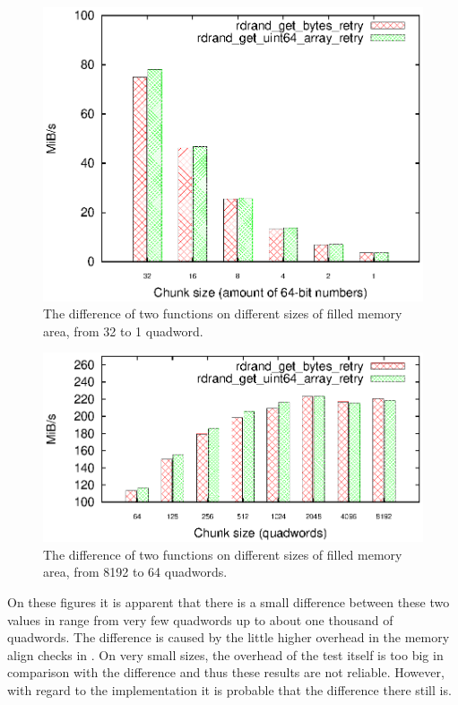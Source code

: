\begin{figure}[h!]
  \centering
 \includegraphics[width=12cm]{fig/tests/bytes_array_speed_low.eps} %
\caption{The difference of two functions on different sizes of filled memory area, from 32 to 1 quadword.}
\label{fig:testing:bytesArrayLow}
\end{figure}

\begin{figure}[h!]
  \centering
 \includegraphics[width=12cm]{fig/tests/bytes_array_speed_hi.eps} %
\caption{The difference of two functions on different sizes of filled memory area, from 8192 to 64 quadwords.}
\label{fig:testing:bytesArrayHi}
\end{figure}

On these figures it is apparent that there is a small difference between these two values in range from very few quadwords up to about one thousand of quadwords. The difference is caused by the little higher overhead in the memory align checks in . On very small sizes, the overhead of the test itself is too big in comparison with the difference and thus these results are not reliable. However, with regard to the implementation it is probable that the difference there still is.

